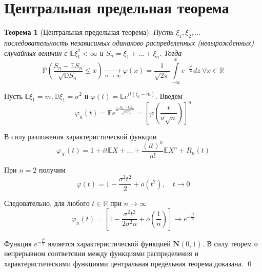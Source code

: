 \documentclass[oneside,final,14pt]{extreport}
\renewenvironment{proof}{{\bfseries Доказательство.}}{\qed}
\newtheorem{thm}{Теорема}[section]
\theoremstyle{definition}
\begin{document}
\section{Центральная предельная теорема}
\begin{thm}[Центральная предельная теорема]
    Пусть $\xi_{1}, \xi_{2}, \ldots$~--- последовательность независимых одинаково распределенных (невырожденных) случайных величин с $\mathbb{E} \xi_{1}^{2}<\infty$ и $S_{n}=\xi_{1}+\ldots+\xi_{n}$. Тогда
    \begin{equation*}
        \mathbb{P}\left(\frac{S_{n}-\mathbb{E} S_{n}}{\sqrt{\mathbb{D} S_{n}}} \leqslant x\right)
        \xrightarrow[n \rightarrow \infty]{}
        \varphi(x) = \frac{1}{\sqrt{2 \pi}} \int\limits_{-\infty}^{x} e^{-\frac{z^{2}}{2}} dz~ \forall x \in \mathbb{R}
    \end{equation*}
\end{thm}
\begin{proof}
Пусть $\mathbb{E} \xi_{1}=m, \mathbb{D} \xi_{1}=\sigma^{2}$ и $\varphi(t)=\mathbb{E} e^{i t\left(\xi_{1}-m\right)}$. Введём
\begin{equation*}
    \varphi_{n}(t)=\mathbb{E} e^{i t \frac{S_{n}-\mathbb{E} S_{n}}{\sqrt{\mathbb{D} S_{n}}}} = 
    \left[\varphi\left(\frac{t}{\sigma \sqrt{n}}\right)\right]^{n}
\end{equation*}

В силу разложения характеристической функции
\begin{equation*}
    \varphi_{X}(t)=1+i t \mathbb{E} X+\ldots+\frac{(i t)^{n}}{n !} \mathbb{E} X^{n}+R_{n}(t)
\end{equation*}

При $n=2$ получим 
\begin{equation*}
    \varphi(t)=1-\frac{\sigma^{2} t^{2}}{2}+\bar{o}\left(t^{2}\right), \quad t \rightarrow 0
\end{equation*}

Следовательно, для любого $t \in \mathbb{R}$ при $n \rightarrow \infty$
\begin{equation*}
    \varphi_{n}(t)=\left[1-\frac{\sigma^{2} t^{2}}{2 \sigma^{2} n}+\bar{o}\left(\frac{1}{n}\right)\right] \rightarrow e^{-\frac{t^{2}}{2}}
\end{equation*}

Функция $e^{-\frac{t^{2}}{2}}$ является характеристической функцией $\mathbf{N}(0,1)$. В силу теорем о непрерывном соответсвии между функциями распределения и характеристическими функциями центральная предельная теорема доказана.
\end{proof}
\end{document}
